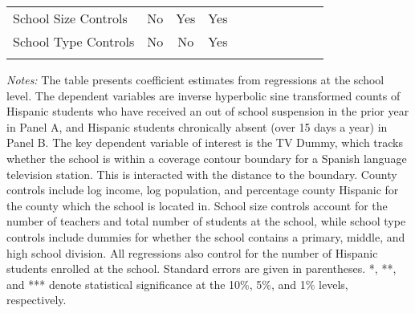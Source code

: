 \begin{table}[!h]
{\begin{threeparttable}
\begin{tabular}{lcccccccccc}
                                School Size Controls & No & Yes & Yes\\
                                School Type Controls & No & No & Yes \\
				\addlinespace\hline\hline
			\end{tabular}
			\begin{tablenotes}[flushleft]
				\item \textit{Notes:} The table presents coefficient estimates from regressions at the school level. The dependent variables are inverse hyperbolic sine transformed counts of Hispanic students who have received an out of school suspension in the prior year in Panel A, and Hispanic students chronically absent (over 15 days a year) in Panel B. The key dependent variable of interest is the TV Dummy, which tracks whether the school is within a coverage contour boundary for a Spanish language television station. This is interacted with the distance to the boundary. County controls include log income, log population, and percentage county Hispanic for the county which the school is located in. School size controls account for the number of teachers and total number of students at the school, while school type controls include dummies for whether the school contains a primary, middle, and high school division. All regressions also control for the number of Hispanic students enrolled at the school. Standard errors are given in parentheses. *, **, and *** denote statistical significance at the 10\%, 5\%, and 1\% levels, respectively.
			\end{tablenotes}
		\end{threeparttable}
	}
\end{table}